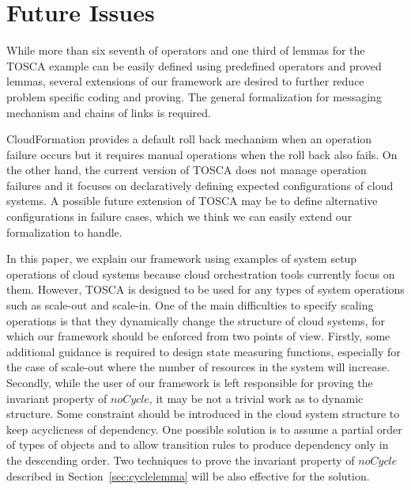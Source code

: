 \documentclass[12pt]{report}
\begin{document}
\section{Future Issues}
While more than six seventh of operators and one third of lemmas for
the TOSCA example can be easily defined using predefined operators and
proved lemmas, several extensions of our framework are desired to
further reduce problem specific coding and proving. The general formalization
for messaging mechanism and chains of links is required.

CloudFormation provides a default roll back mechanism when an
operation failure occurs but it requires manual operations when the
roll back also fails. On the other hand, the current version of TOSCA
does not manage operation failures and it focuses on declaratively
defining expected configurations of cloud systems. A possible
future extension of TOSCA may be to define alternative configurations
in failure cases, which we think we can easily extend our
formalization to handle.

In this paper, we explain our framework using examples of system setup
operations of cloud systems because cloud orchestration tools
currently focus on them. However, TOSCA is designed to be used for any
types of system operations such as scale-out and scale-in. One of the
main difficulties to specify scaling operations is that they
dynamically change the structure of cloud systems, for which our
framework should be enforced from two points of view. Firstly, some
additional guidance is required to design state measuring functions,
especially for the case of scale-out where the number of resources in
the system will increase. Secondly, while the user of our framework is
left responsible for proving the invariant property of $noCycle$, it
may be not a trivial work as to dynamic structure. Some constraint
should be introduced in the cloud system structure to keep acyclicness
of dependency. One possible solution is to assume a partial order of
types of objects and to allow transition rules to produce dependency
only in the descending order. Two techniques to prove the invariant
property of $noCycle$ described in Section~\ref{sec:cyclelemma} will
be also effective for the solution.

\end{document}

